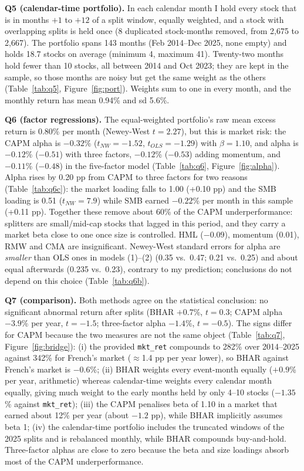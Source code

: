 \documentclass[10pt]{article}
\begin{document}
\medskip
\noindent\textbf{Q5 (calendar-time portfolio).} In each calendar month I hold every stock that is in months $+1$ to $+12$ of a split window, equally weighted, and a stock with overlapping splits is held once (8 duplicated stock-months removed, from 2,675 to 2,667). The portfolio spans 143 months (Feb 2014--Dec 2025, none empty) and holds 18.7 stocks on average (minimum 4, maximum 41). Twenty-two months hold fewer than 10 stocks, all between 2014 and Oct 2023; they are kept in the sample, so those months are noisy but get the same weight as the others (Table~\ref{tab:q5}, Figure~\ref{fig:port}). Weights sum to one in every month, and the monthly return has mean 0.94\% and sd 5.6\%.

\medskip
\noindent\textbf{Q6 (factor regressions).} The equal-weighted portfolio's raw mean excess return is 0.80\% per month (Newey-West $t=2.27$), but this is market risk: the CAPM alpha is $-0.32$\% ($t_{NW}=-1.52$, $t_{OLS}=-1.29$) with $\beta=1.10$, and alpha is $-0.12$\% ($-0.51$) with three factors, $-0.12$\% ($-0.53$) adding momentum, and $-0.11$\% ($-0.48$) in the five-factor model (Table~\ref{tab:q6}, Figure~\ref{fig:alpha}). Alpha rises by 0.20 pp from CAPM to three factors for two reasons (Table~\ref{tab:q6c}): the market loading falls to 1.00 (+0.10 pp) and the SMB loading is 0.51 ($t_{NW}=7.9$) while SMB earned $-0.22$\% per month in this sample (+0.11 pp). Together these remove about 60\% of the CAPM underperformance: splitters are small/mid-cap stocks that lagged in this period, and they carry a market beta close to one once size is controlled. HML ($-0.09$), momentum (0.01), RMW and CMA are insignificant. Newey-West standard errors for alpha are \emph{smaller} than OLS ones in models (1)--(2) (0.35 vs.\ 0.47; 0.21 vs.\ 0.25) and about equal afterwards (0.235 vs.\ 0.23), contrary to my prediction; conclusions do not depend on this choice (Table~\ref{tab:q6b}).

\medskip
\noindent\textbf{Q7 (comparison).} Both methods agree on the statistical conclusion: no significant abnormal return after splits (BHAR $+0.7$\%, $t=0.3$; CAPM alpha $-3.9$\% per year, $t=-1.5$; three-factor alpha $-1.4$\%, $t=-0.5$). The signs differ for CAPM because the two measures are not the same object (Table~\ref{tab:q7}, Figure~\ref{fig:bridge}): (i) the provided \texttt{mkt\_ret} compounds to 282\% over 2014--2025 against 342\% for French's market ($\approx$1.4 pp per year lower), so BHAR against French's market is $-0.6$\%; (ii) BHAR weights every event-month equally ($+0.9$\% per year, arithmetic) whereas calendar-time weights every calendar month equally, giving much weight to the early months held by only 4--10 stocks ($-1.35$\% against \texttt{mkt\_ret}); (iii) the CAPM penalises beta of 1.10 in a market that earned about 12\% per year (about $-1.2$ pp), while BHAR implicitly assumes beta 1; (iv) the calendar-time portfolio includes the truncated windows of the 2025 splits and is rebalanced monthly, while BHAR compounds buy-and-hold. Three-factor alphas are close to zero because the beta and size loadings absorb most of the CAPM underperformance.
\end{document}

